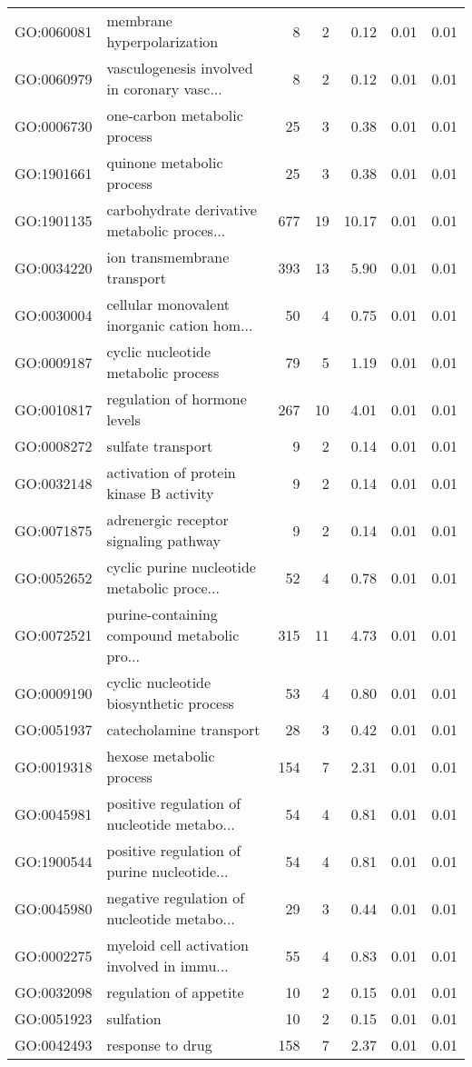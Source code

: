 \begin{table}[ht]
\begin{tabular}{llrrrrr}
  GO:0060081 & membrane hyperpolarization &   8 &   2 & 0.12 & 0.01 & 0.01 \\ 
  GO:0060979 & vasculogenesis involved in coronary vasc... &   8 &   2 & 0.12 & 0.01 & 0.01 \\ 
  GO:0006730 & one-carbon metabolic process &  25 &   3 & 0.38 & 0.01 & 0.01 \\ 
  GO:1901661 & quinone metabolic process &  25 &   3 & 0.38 & 0.01 & 0.01 \\ 
  GO:1901135 & carbohydrate derivative metabolic proces... & 677 &  19 & 10.17 & 0.01 & 0.01 \\ 
  GO:0034220 & ion transmembrane transport & 393 &  13 & 5.90 & 0.01 & 0.01 \\ 
  GO:0030004 & cellular monovalent inorganic cation hom... &  50 &   4 & 0.75 & 0.01 & 0.01 \\ 
  GO:0009187 & cyclic nucleotide metabolic process &  79 &   5 & 1.19 & 0.01 & 0.01 \\ 
  GO:0010817 & regulation of hormone levels & 267 &  10 & 4.01 & 0.01 & 0.01 \\ 
  GO:0008272 & sulfate transport &   9 &   2 & 0.14 & 0.01 & 0.01 \\ 
  GO:0032148 & activation of protein kinase B activity &   9 &   2 & 0.14 & 0.01 & 0.01 \\ 
  GO:0071875 & adrenergic receptor signaling pathway &   9 &   2 & 0.14 & 0.01 & 0.01 \\ 
  GO:0052652 & cyclic purine nucleotide metabolic proce... &  52 &   4 & 0.78 & 0.01 & 0.01 \\ 
  GO:0072521 & purine-containing compound metabolic pro... & 315 &  11 & 4.73 & 0.01 & 0.01 \\ 
  GO:0009190 & cyclic nucleotide biosynthetic process &  53 &   4 & 0.80 & 0.01 & 0.01 \\ 
  GO:0051937 & catecholamine transport &  28 &   3 & 0.42 & 0.01 & 0.01 \\ 
  GO:0019318 & hexose metabolic process & 154 &   7 & 2.31 & 0.01 & 0.01 \\ 
  GO:0045981 & positive regulation of nucleotide metabo... &  54 &   4 & 0.81 & 0.01 & 0.01 \\ 
  GO:1900544 & positive regulation of purine nucleotide... &  54 &   4 & 0.81 & 0.01 & 0.01 \\ 
  GO:0045980 & negative regulation of nucleotide metabo... &  29 &   3 & 0.44 & 0.01 & 0.01 \\ 
  GO:0002275 & myeloid cell activation involved in immu... &  55 &   4 & 0.83 & 0.01 & 0.01 \\ 
  GO:0032098 & regulation of appetite &  10 &   2 & 0.15 & 0.01 & 0.01 \\ 
  GO:0051923 & sulfation &  10 &   2 & 0.15 & 0.01 & 0.01 \\ 
  GO:0042493 & response to drug & 158 &   7 & 2.37 & 0.01 & 0.01 \\ 
   \hline
\end{tabular}
\end{table}

